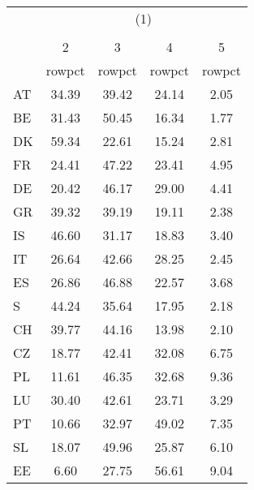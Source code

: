{
\def\sym#1{\ifmmode^{#1}\else\(^{#1}\)\fi}
\begin{tabular}{l*{4}{c}}
\hline\hline
            &\multicolumn{4}{c}{(1)}                            \\
            &\multicolumn{4}{c}{}                               \\
            &           2&           3&           4&           5\\
            &      rowpct&      rowpct&      rowpct&      rowpct\\
\hline
AT          &       34.39&       39.42&       24.14&        2.05\\
BE          &       31.43&       50.45&       16.34&        1.77\\
DK          &       59.34&       22.61&       15.24&        2.81\\
FR          &       24.41&       47.22&       23.41&        4.95\\
DE          &       20.42&       46.17&       29.00&        4.41\\
GR          &       39.32&       39.19&       19.11&        2.38\\
IS          &       46.60&       31.17&       18.83&        3.40\\
IT          &       26.64&       42.66&       28.25&        2.45\\
ES          &       26.86&       46.88&       22.57&        3.68\\
S           &       44.24&       35.64&       17.95&        2.18\\
CH          &       39.77&       44.16&       13.98&        2.10\\
CZ          &       18.77&       42.41&       32.08&        6.75\\
PL          &       11.61&       46.35&       32.68&        9.36\\
LU          &       30.40&       42.61&       23.71&        3.29\\
PT          &       10.66&       32.97&       49.02&        7.35\\
SL          &       18.07&       49.96&       25.87&        6.10\\
EE          &        6.60&       27.75&       56.61&        9.04\\
\hline\hline
\end{tabular}
}
